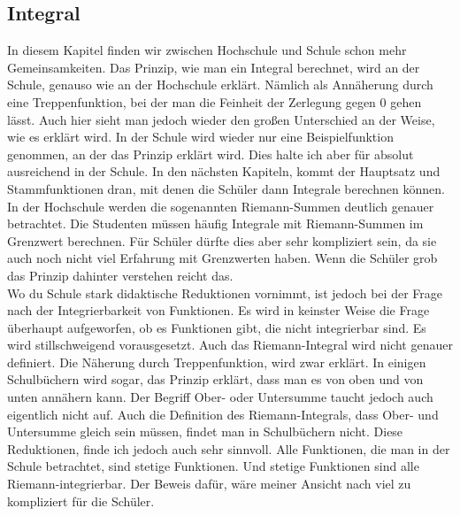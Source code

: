 \documentclass[a4paper]{article}
\begin{document}
\subsection{Integral}
In diesem Kapitel finden wir zwischen Hochschule und Schule schon mehr Gemeinsamkeiten. Das Prinzip, wie man ein Integral berechnet, wird an der Schule, genauso wie an der Hochschule erklärt. Nämlich als Annäherung durch eine Treppenfunktion, bei der man die Feinheit der Zerlegung gegen 0 gehen lässt. Auch hier sieht man jedoch wieder den großen Unterschied an der Weise, wie es erklärt wird. In der Schule wird wieder nur eine Beispielfunktion genommen, an der das Prinzip erklärt wird. Dies halte ich aber für absolut ausreichend in der Schule. In den nächsten Kapiteln, kommt der Hauptsatz und Stammfunktionen dran, mit denen die Schüler dann Integrale berechnen können. In der Hochschule werden die sogenannten Riemann-Summen deutlich genauer betrachtet. Die Studenten müssen häufig Integrale mit Riemann-Summen im Grenzwert berechnen. Für Schüler dürfte dies aber sehr kompliziert sein, da sie auch noch nicht viel Erfahrung mit Grenzwerten haben. Wenn die Schüler grob das Prinzip dahinter verstehen reicht das. \\
Wo du Schule stark didaktische Reduktionen vornimmt, ist jedoch bei der Frage nach der Integrierbarkeit von Funktionen. Es wird in keinster Weise die Frage überhaupt aufgeworfen, ob es Funktionen gibt, die nicht integrierbar sind. Es wird stillschweigend vorausgesetzt. Auch das Riemann-Integral wird nicht genauer definiert. Die Näherung durch Treppenfunktion, wird zwar erklärt. In einigen Schulbüchern wird sogar, das Prinzip erklärt, dass man es von oben und von unten annähern kann. Der Begriff Ober- oder Untersumme taucht jedoch auch eigentlich nicht auf. Auch die Definition des Riemann-Integrals, dass Ober- und Untersumme gleich sein müssen, findet man in Schulbüchern nicht. Diese Reduktionen, finde ich jedoch auch sehr sinnvoll. Alle Funktionen, die man in der Schule betrachtet, sind stetige Funktionen. Und stetige Funktionen sind alle Riemann-integrierbar. Der Beweis dafür, wäre meiner Ansicht nach viel zu kompliziert für die Schüler. 
\end{document}
